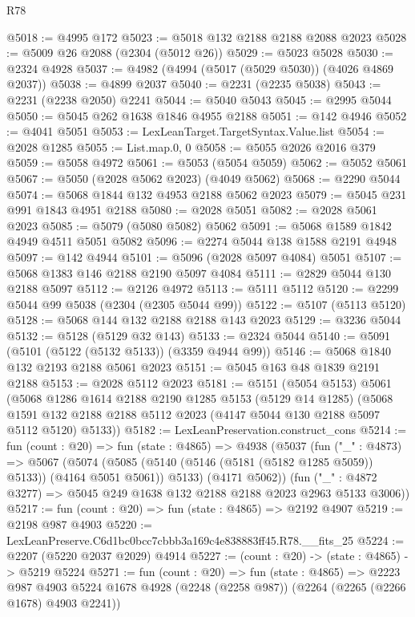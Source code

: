 \begin{lexlean}{R78}
\begin{coremodule}
@5018 := @4995 @172
@5023 := @5018 @132 @2188 @2188 @2088 @2023
@5028 := @5009 @26 @2088 (@2304 (@5012 @26))
@5029 := @5023 @5028
@5030 := @2324 @4928
@5037 := @4982 (@4994 (@5017 (@5029 @5030)) (@4026 @4869 @2037))
@5038 := @4899 @2037
@5040 := @2231 (@2235 @5038)
@5043 := @2231 (@2238 @2050) @2241
@5044 := @5040 @5043
@5045 := @2995 @5044
@5050 := @5045 @262 @1638 @1846 @4955 @2188
@5051 := @142 @4946
@5052 := @4041 @5051
@5053 := LexLeanTarget.TargetSyntax.Value.list
@5054 := @2028 @1285
@5055 := List.map.{0, 0}
@5058 := @5055 @2026 @2016 @379
@5059 := @5058 @4972
@5061 := @5053 (@5054 @5059)
@5062 := @5052 @5061
@5067 := @5050 (@2028 @5062 @2023) (@4049 @5062)
@5068 := @2290 @5044
@5074 := @5068 @1844 @132 @4953 @2188 @5062 @2023
@5079 := @5045 @231 @991 @1843 @4951 @2188
@5080 := @2028 @5051
@5082 := @2028 @5061 @2023
@5085 := @5079 (@5080 @5082) @5062
@5091 := @5068 @1589 @1842 @4949 @4511 @5051 @5082
@5096 := @2274 @5044 @138 @1588 @2191 @4948
@5097 := @142 @4944
@5101 := @5096 (@2028 @5097 @4084) @5051
@5107 := @5068 @1383 @146 @2188 @2190 @5097 @4084
@5111 := @2829 @5044 @130 @2188 @5097
@5112 := @2126 @4972
@5113 := @5111 @5112
@5120 := @2299 @5044 @99 @5038 (@2304 (@2305 @5044 @99))
@5122 := @5107 (@5113 @5120)
@5128 := @5068 @144 @132 @2188 @2188 @143 @2023
@5129 := @3236 @5044
@5132 := @5128 (@5129 @32 @143)
@5133 := @2324 @5044
@5140 := @5091 (@5101 (@5122 (@5132 @5133)) (@3359 @4944 @99))
@5146 := @5068 @1840 @132 @2193 @2188 @5061 @2023
@5151 := @5045 @163 @48 @1839 @2191 @2188
@5153 := @2028 @5112 @2023
@5181 := @5151
    (@5054 @5153)
    @5061
    (@5068
      @1286
      @1614
      @2188
      @2190
      @1285
      @5153
      (@5129 @14 @1285)
      (@5068 @1591 @132 @2188 @2188 @5112 @2023 (@4147 @5044 @130 @2188 @5097 @5112 @5120) @5133))
@5182 := LexLeanPreservation.construct_cons
@5214 := fun (count : @20) =>
  fun (state : @4865) =>
  @4938
    (@5037
      (fun ("_" : @4873) =>
      @5067
        (@5074 (@5085 (@5140 (@5146 (@5181 (@5182 @1285 @5059)) @5133)) (@4164 @5051 @5061)) @5133)
        (@4171 @5062))
      (fun ("_" : @4872 @3277) => @5045 @249 @1638 @132 @2188 @2188 @2023 @2963 @5133 @3006))
@5217 := fun (count : @20) => fun (state : @4865) => @2192 @4907
@5219 := @2198 @987 @4903
@5220 := LexLeanPreserve.C6d1bc0bcc7cbbb3a169c4e838883ff45.R78.__fits_25
@5224 := @2207 (@5220 @2037 @2029) @4914
@5227 := (count : @20) -> (state : @4865) -> @5219 @5224
@5271 := fun (count : @20) =>
  fun (state : @4865) =>
  @2223
    @987
    @4903
    @5224
    @1678
    @4928
    (@2248 (@2258 @987))
    (@2264 (@2265 (@2266 @1678) @4903 @2241))

\end{coremodule}
\end{lexlean}
